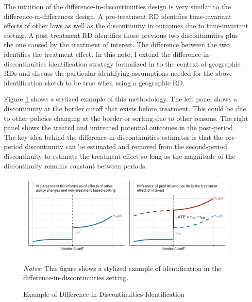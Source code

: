 \documentclass[12pt]{article}
\begin{document}
The intuition of the difference-in-discontinuities design is very similar to the difference-in-differences design. A pre-treatment RD identifies time-invariant effects of other laws as well as the discontinuity in outcomes due to time-invariant sorting. A post-treatment RD identifies those previous two discontinuities plus the one caused by the treatment of interest. The difference between the two identifies the treatment effect. In this note, I extend the difference-in-discontinuities identification strategy formalized in \citet{Grembi_Nannicini_Troiano_2016,Eggers_Freier_Grembi_Nannicini_2018} to the context of geographic RDs and discuss the particular identifying assumptions needed for the above identification sketch to be true when using a geographic RD. 

Figure \ref{fig:example} shows a stylized example of this methodology. The left panel shows a discontinuity at the border cutoff that exists before treatment. This could be due to other policies changing at the border or sorting due to other reasons. The right panel shows the treated and untreated potential outcomes in the post-period. The key idea behind the difference-in-discontinuities estimator is that the pre-period discontinuity can be estimated and removed from the second-period discontinuity to estimate the treatment effect so long as the magnitude of the discontinuity remains constant between periods.

\begin{figure}[tb]
    \caption{Example of Difference-in-Discontinuities Identification}
    \label{fig:example}

    \begin{adjustbox}{width = 1\textwidth, center}
        \includegraphics[width=\textwidth]{../../figures/diff_in_disc.pdf}
    \end{adjustbox}

    {\footnotesize \emph{Notes:} This figure shows a stylized example of identification in the difference-in-discontinuities setting.}
\end{figure}
\end{document}
